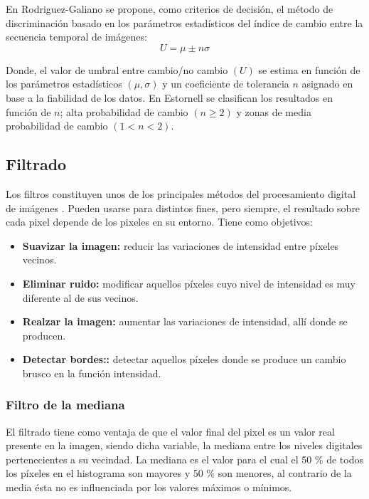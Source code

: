 En Rodriguez-Galiano \cite{rodriguez2010analisis} se propone, como criterios de decisi\'on, el m\'etodo de discriminaci\'on basado en los par\'ametros estad\'isticos del \'indice de cambio entre la secuencia temporal de im\'agenes:
\begin{equation}
U=\mu \pm n\sigma
\end{equation}

Donde, el valor de umbral entre cambio/no cambio $ (U) $ se estima en funci\'on de los par\'ametros estad\'isticos $ (\mu, \sigma) $ y un coeficiente de tolerancia $ n $ asignado en base a la fiabilidad de los datos. En Estornell \cite{estornell2004analisis} se clasifican los resultados en funci\'on de $ n $; alta probabilidad de cambio $ (n \geq 2) $ y
zonas de media probabilidad de cambio $ (1 < n < 2) $.

\subsection{Filtrado}
Los filtros constituyen unos de los principales m\'etodos del procesamiento digital de im\'agenes . Pueden usarse para distintos fines, pero siempre, el resultado sobre cada pixel depende de los pixeles en su entorno. Tiene como objetivos: 
	\begin{itemize}
		\item \textbf{Suavizar la imagen:} reducir las variaciones de intensidad entre p\'ixeles vecinos.
		\item \textbf{Eliminar ruido:}  modificar aquellos p\'ixeles cuyo nivel de intensidad es muy diferente al de sus vecinos.
		\item \textbf{Realzar la imagen:} aumentar las variaciones de intensidad, all\'i donde se producen.
		\item \textbf{Detectar bordes::} detectar aquellos p\'ixeles donde se produce un cambio brusco en la funci\'on intensidad.	
	\end{itemize}
\subsubsection{Filtro de la mediana}
El filtrado tiene como ventaja de que el valor final del pixel es un valor real presente en la imagen, siendo dicha variable, la mediana entre los niveles digitales pertenecientes a su vecindad. La mediana es el valor para el cual el 50 \% de todos los p\'ixeles en el histograma son mayores y 50 \% son menores, al contrario de la media \'esta no es influenciada por los valores m\'aximos o m\'inimos\cite{mehl1997fundamentos}.

